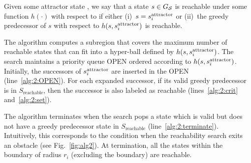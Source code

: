 \documentclass[a4paper,10pt]{article}
\begin{document}
\vspace{2mm}
\begin{definition}
  Given some attractor state \sAttract, we say that a state $s \in G_\mathcal{S}$ is reachable under some function $h(\cdot)$ with respect to \sAttract if either
  (i)~$s = s^{\text{attractor}}_i$ or
  (ii)~the greedy predecessor of $s$ with respect to $h(s,s^{\text{attractor}}_i)$ is reachable.
\end{definition}

The algorithm computes a subregion that covers the maximum number of reachable states that can fit into a hyper-ball defined by $h(s,s^{\text{attractor}}_i)$. 
The search maintains a priority queue OPEN ordered according to $h(s,s^{\text{attractor}}_i)$. Initially, the successors of $s^{\text{attractor}}_i$ are inserted in the OPEN (line~\ref{alg:2:OPEN}). For each expanded successor, if its valid greedy predecessor is in $S_{\text{reachable}}$, then the successor is also labeled as reachable (lines~\ref{alg:2:crit} and~\ref{alg:2:set}). 

The algorithm terminates when the search pops a state which is valid but does not have a greedy predecessor state in $S_{\text{reachable}}$ (line~\ref{alg:2:terminate}). Intuitively, this corresponds to  the condition when the reachability search exits an obstacle (see Fig.~\ref{fig:alg2}).
At termination, all the states within the boundary of radius $r_i$ (excluding the boundary) are reachable.
\end{document}
